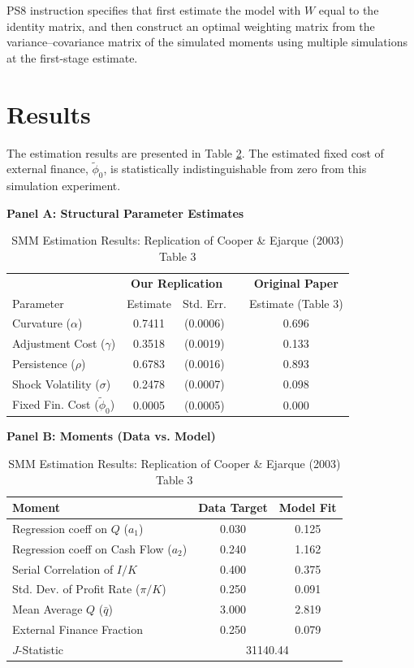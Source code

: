 \documentclass[11pt]{article}
\begin{document}
PS8 instruction specifies that first estimate the model with $W$ equal to the identity matrix, and then construct an optimal weighting matrix from the variance–covariance matrix of the simulated moments using multiple simulations at the first-stage estimate. 

\section{Results}

The estimation results are presented in Table \ref{tab:results}. The estimated fixed cost of external finance, $\tilde{\phi}_0$, is statistically indistinguishable from zero from this simulation experiment.

\begin{table}[htbp]
\centering
\caption{SMM Estimation Results: Replication of Cooper \& Ejarque (2003) Table 3}
\label{tab:results}
\vspace{0.2cm}
\textbf{Panel A: Structural Parameter Estimates} \\
\vspace{0.1cm}
\begin{tabular}{lccc|c}
\hline\hline
& \multicolumn{2}{c}{\textbf{Our Replication}} & & \textbf{Original Paper} \\
Parameter & Estimate & Std. Err. & & Estimate (Table 3) \\
\hline
Curvature ($\alpha$)          & 0.7411 & (0.0006) & & 0.696 \\
Adjustment Cost ($\gamma$)    & 0.3518 & (0.0019) & & 0.133 \\
Persistence ($\rho$)          & 0.6783 & (0.0016) & & 0.893 \\
Shock Volatility ($\sigma$)   & 0.2478 & (0.0007) & & 0.098 \\
Fixed Fin. Cost ($\tilde{\phi}_0$) & 0.0005 & (0.0005) & & 0.000 \\
\hline\hline
\end{tabular}

\vspace{0.5cm}
\textbf{Panel B: Moments (Data vs. Model)} \\
\vspace{0.1cm}
\begin{tabular}{lcc}
\hline\hline
Moment & Data Target & Model Fit \\
\hline
Regression coeff on $Q$ ($a_1$)       & 0.030 & 0.125 \\
Regression coeff on Cash Flow ($a_2$) & 0.240 & 1.162 \\
Serial Correlation of $I/K$           & 0.400 & 0.375 \\
Std. Dev. of Profit Rate ($\pi/K$)    & 0.250 & 0.091 \\
Mean Average $Q$ ($\bar{q}$)          & 3.000 & 2.819 \\
External Finance Fraction             & 0.250 & 0.079 \\
\hline
$J$-Statistic & \multicolumn{2}{c}{31140.44} \\
\hline\hline
\end{tabular}
\end{table}
\end{document}
